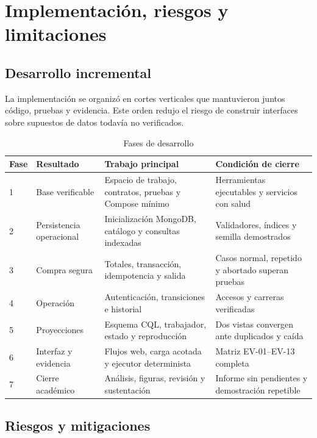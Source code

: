 \chapter{Implementación, riesgos y limitaciones}
\label{chap:plan}

\section{Desarrollo incremental}

La implementación se organizó en cortes verticales que mantuvieron juntos código, pruebas y evidencia. Este orden redujo el riesgo de construir interfaces sobre supuestos de datos todavía no verificados.

\begin{table}[H]
  \centering
  \caption{Fases de desarrollo}
  \label{tab:fases}
  \begin{tabularx}{\textwidth}{@{}p{1.2cm}p{3.4cm}YY@{}}
    \toprule
    \textbf{Fase} & \textbf{Resultado} & \textbf{Trabajo principal} & \textbf{Condición de cierre} \\
     & Base verificable & Espacio de trabajo, contratos, pruebas y Compose mínimo & Herramientas ejecutables y servicios con salud \\
    2 & Persistencia operacional & Inicialización MongoDB, catálogo y consultas indexadas & Validadores, índices y semilla demostrados \\
    3 & Compra segura & Totales, transacción, idempotencia y salida & Casos normal, repetido y abortado superan pruebas \\
    4 & Operación & Autenticación, transiciones e historial & Accesos y carreras verificadas \\
    5 & Proyecciones & Esquema CQL, trabajador, estado y reproducción & Dos vistas convergen ante duplicados y caída \\
    6 & Interfaz y evidencia & Flujos web, carga acotada y ejecutor determinista & Matriz EV-01--EV-13 completa \\
    7 & Cierre académico & Análisis, figuras, revisión y sustentación & Informe sin pendientes y demostración repetible \\
    \bottomrule
  \end{tabularx}
\end{table}

\section{Riesgos y mitigaciones}


